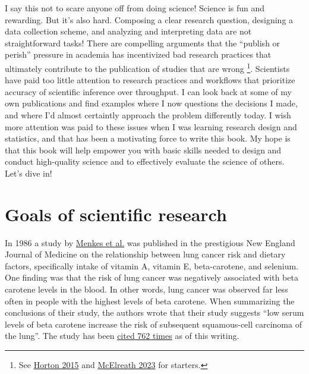 \documentclass[
]{book}
\begin{document}
I say this not to scare anyone off from doing science! Science is fun and rewarding. But it's also hard. Composing a clear research question, designing a data collection scheme, and analyzing and interpreting data are not straightforward tasks! There are compelling arguments that the ``publish or perish'' pressure in academia has incentivized bad research practices that ultimately contribute to the publication of studies that are wrong \footnote{See \href{https://www.thelancet.com/journals/lancet/article/PIIS0140-6736(15)60696-1/fulltext}{Horton 2015} and \href{https://elevanth.org/2023_06_13_Science_Dumpster_Fire.html}{McElreath 2023} for starters.}. Scientists have paid too little attention to research practices and workflows that prioritize accuracy of scientific inference over throughput. I can look back at some of my own publications and find examples where I now questions the decisions I made, and where I'd almost certaintly approach the problem differently today. I wish more attention was paid to these issues when I was learning research design and statistics, and that has been a motivating force to write this book. My hope is that this book will help empower you with basic skills needed to design and conduct high-quality science and to effectively evaluate the science of others. Let's dive in!

\section{Goals of scientific research}\label{goals-of-scientific-research}

In 1986 a study by \href{https://www.nejm.org/doi/full/10.1056/NEJM198611133152003}{Menkes et al.} was published in the prestigious New England Journal of Medicine on the relationship between lung cancer risk and dietary factors, specifically intake of vitamin A, vitamin E, beta-carotene, and selenium. One finding was that the risk of lung cancer was negatively associated with beta carotene levels in the blood. In other words, lung cancer was observed far less often in people with the highest levels of beta carotene. When summarizing the conclusions of their study, the authors wrote that their study suggests ``low serum levels of beta carotene increase the risk of subsequent squamous-cell carcinoma of the lung''. The study has been \href{https://scholar.google.com/scholar?hl=en&as_sdt=0\%2C33&q=Serum+beta-carotene\%2C+vitamins+A+and+E\%2C+selenium\%2C+and+the+risk+of+lung+cancer+&btnG=}{cited 762 times} as of this writing.
\end{document}
